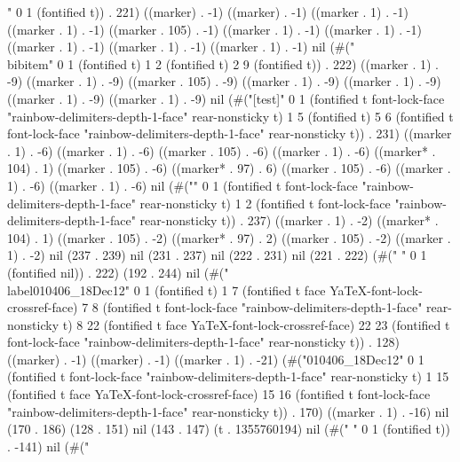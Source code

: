 {" 0 1 (fontified t)) . 221) ((marker) . -1) ((marker) . -1) ((marker . 1) . -1) ((marker . 1) . -1) ((marker . 105) . -1) ((marker . 1) . -1) ((marker . 1) . -1) ((marker . 1) . -1) ((marker . 1) . -1) ((marker . 1) . -1) nil (#(" \\bibitem" 0 1 (fontified t) 1 2 (fontified t) 2 9 (fontified t)) . 222) ((marker . 1) . -9) ((marker . 1) . -9) ((marker . 105) . -9) ((marker . 1) . -9) ((marker . 1) . -9) ((marker . 1) . -9) ((marker . 1) . -9) nil (#("[test]" 0 1 (fontified t font-lock-face "rainbow-delimiters-depth-1-face" rear-nonsticky t) 1 5 (fontified t) 5 6 (fontified t font-lock-face "rainbow-delimiters-depth-1-face" rear-nonsticky t)) . 231) ((marker . 1) . -6) ((marker . 1) . -6) ((marker . 105) . -6) ((marker . 1) . -6) ((marker* . 104) . 1) ((marker . 105) . -6) ((marker* . 97) . 6) ((marker . 105) . -6) ((marker . 1) . -6) ((marker . 1) . -6) nil (#("{}" 0 1 (fontified t font-lock-face "rainbow-delimiters-depth-1-face" rear-nonsticky t) 1 2 (fontified t font-lock-face "rainbow-delimiters-depth-1-face" rear-nonsticky t)) . 237) ((marker . 1) . -2) ((marker* . 104) . 1) ((marker . 105) . -2) ((marker* . 97) . 2) ((marker . 105) . -2) ((marker . 1) . -2) nil (237 . 239) nil (231 . 237) nil (222 . 231) nil (221 . 222) (#(" " 0 1 (fontified nil)) . 222) (192 . 244) nil (#("
\\label{010406_18Dec12}" 0 1 (fontified t) 1 7 (fontified t face YaTeX-font-lock-crossref-face) 7 8 (fontified t font-lock-face "rainbow-delimiters-depth-1-face" rear-nonsticky t) 8 22 (fontified t face YaTeX-font-lock-crossref-face) 22 23 (fontified t font-lock-face "rainbow-delimiters-depth-1-face" rear-nonsticky t)) . 128) ((marker) . -1) ((marker) . -1) ((marker . 1) . -21) (#("{010406_18Dec12}" 0 1 (fontified t font-lock-face "rainbow-delimiters-depth-1-face" rear-nonsticky t) 1 15 (fontified t face YaTeX-font-lock-crossref-face) 15 16 (fontified t font-lock-face "rainbow-delimiters-depth-1-face" rear-nonsticky t)) . 170) ((marker . 1) . -16) nil (170 . 186) (128 . 151) nil (143 . 147) (t . 1355760194) nil (#("
" 0 1 (fontified t)) . -141) nil (#("%
}
